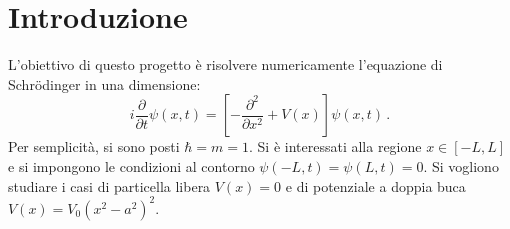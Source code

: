\documentclass[a4paper, titlepage]{article}
\begin{document}

\newcommand{\sch}[0]{Schrödinger }

\section{Introduzione}
L'obiettivo di questo progetto è risolvere numericamente l'equazione di Schrödinger in una dimensione:
\begin{equation}
    i\frac{\partial}{\partial t}\psi(x,t) = \left[-\frac{\partial^2}{\partial x^2} + V(x)\right]\psi(x,t)\, .
    \label{eq:sch}
\end{equation}
Per semplicità, si sono posti $\hbar = m = 1$. Si è interessati alla regione $x \in [-L,L]$ e si impongono le condizioni al contorno $\psi(-L,t) = \psi(L,t) = 0$. Si vogliono studiare i casi di particella libera $V(x) = 0$ e di potenziale a doppia buca $V(x) = V_0(x^2-a^2)^2$.
\end{document}
